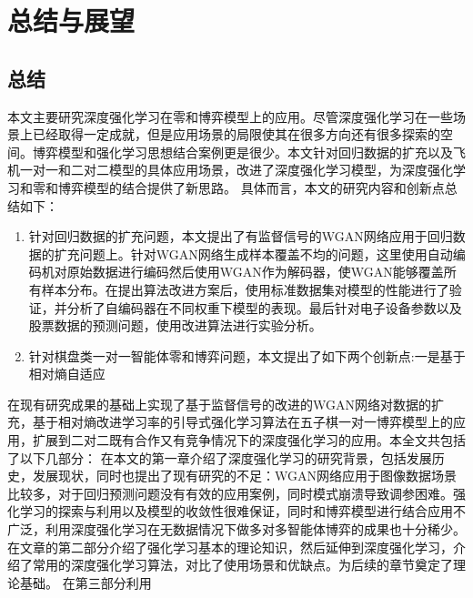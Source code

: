 \chapter{总结与展望}
\section{总结}
本文主要研究深度强化学习在零和博弈模型上的应用。尽管深度强化学习在一些场景上已经取得一定成就，但是应用场景的局限使其在很多方向还有很多探索的空间。博弈模型和强化学习思想结合案例更是很少。本文针对回归数据的扩充以及飞机一对一和二对二模型的具体应用场景，改进了深度强化学习模型，为深度强化学习和零和博弈模型的结合提供了新思路。
具体而言，本文的研究内容和创新点总结如下：
\begin{enumerate}
	\item  针对回归数据的扩充问题，本文提出了有监督信号的WGAN网络应用于回归数据的扩充问题上。针对WGAN网络生成样本覆盖不均的问题，这里使用自动编码机对原始数据进行编码然后使用WGAN作为解码器，使WGAN能够覆盖所有样本分布。在提出算法改进方案后，使用标准数据集对模型的性能进行了验证，并分析了自编码器在不同权重下模型的表现。最后针对电子设备参数以及股票数据的预测问题，使用改进算法进行实验分析。
	\item 针对棋盘类一对一智能体零和博弈问题，本文提出了如下两个创新点:一是基于相对熵自适应
\end{enumerate}
在现有研究成果的基础上实现了基于监督信号的改进的WGAN网络对数据的扩充，基于相对熵改进学习率的引导式强化学习算法在五子棋一对一博弈模型上的应用，扩展到二对二既有合作又有竞争情况下的深度强化学习的应用。本全文共包括了以下几部分：
在本文的第一章介绍了深度强化学习的研究背景，包括发展历史，发展现状，同时也提出了现有研究的不足：WGAN网络应用于图像数据场景比较多，对于回归预测问题没有有效的应用案例，同时模式崩溃导致调参困难。强化学习的探索与利用以及模型的收敛性很难保证，同时和博弈模型进行结合应用不广泛，利用深度强化学习在无数据情况下做多对多智能体博弈的成果也十分稀少。
在文章的第二部分介绍了强化学习基本的理论知识，然后延伸到深度强化学习，介绍了常用的深度强化学习算法，对比了使用场景和优缺点。为后续的章节奠定了理论基础。
在第三部分利用